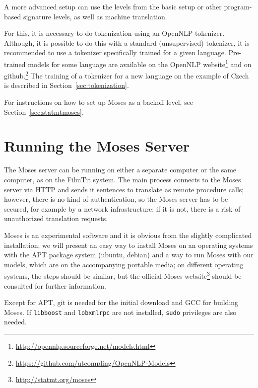 A more advanced setup can use the levels from the basic setup or other program-based signature levels, as well as machine translation. 

For this, it is necessary to do tokenization using an OpenNLP tokenizer. Although, it is possible to do this with a standard (unsupervised) tokenizer, it is recommended to use a tokenizer specifically trained for a given language. Pre-trained models for some language are available on the OpenNLP website\footnote{\url{http://opennlp.sourceforge.net/models.html}} and on github.\footnote{\url{https://github.com/utcompling/OpenNLP-Models}} The training of a tokenizer for a new language on the example of Czech is described in Section~\ref{sec:tokenization}. 

For instructions on how to set up Moses as a backoff level, see Section~\ref{sec:statmtmoses}.

\section{Running the Moses Server}

The Moses server can be running on either a separate computer or the same computer, as on the FilmTit system. The main process connects to the Moses server via HTTP and sends it sentences to translate as remote procedure calls; however, there is no kind of authentication, so the Moses server has to be secured, for example by a network infrastructure; if it is not, there is a risk of unauthorized translation requests.

Moses is an experimental software and it is obvious from the slightly complicated installation; we will present an easy way to install Moses on an operating systems with the APT package system (ubuntu, debian) and a way to run Moses with our models, which are on the accompanying portable media; on different operating systems, the steps should be similar, but the official Moses website\footnote{\url{http://statmt.org/moses}} should be consulted for further information.

Except for APT, git is needed for the initial download and GCC for building Moses. If \texttt{libboost} and \texttt{lobxmlrpc} are not installed, \texttt{sudo} privileges are also needed.

